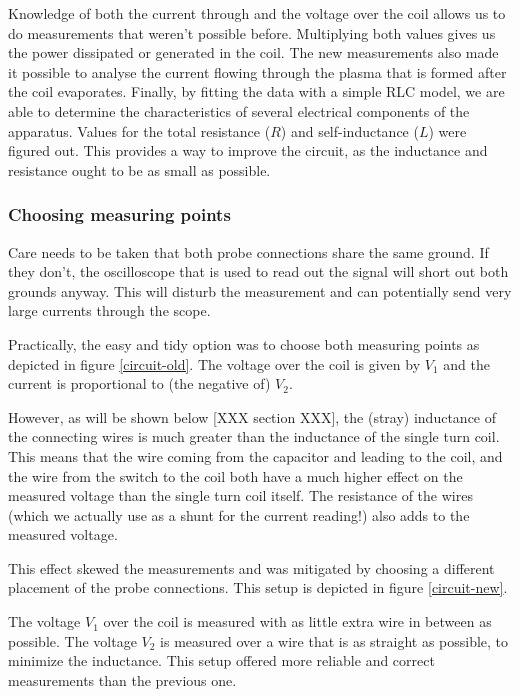 Knowledge of both the current through and the voltage over the coil allows us 
to do measurements that weren't possible before. Multiplying both values gives 
us the power dissipated or generated in the coil. The new measurements also 
made it possible to analyse the current flowing through the plasma that is 
formed after the coil evaporates. Finally, by fitting the data with a simple 
RLC model, we are able to determine the characteristics of several electrical 
components of the apparatus. Values for the total resistance ($R$) and 
self-inductance ($L$) were figured out. This provides a way to improve the 
circuit, as the inductance and resistance ought to be as small as possible.

\subsubsection{Choosing measuring points}
Care needs to be taken that both probe connections share the same ground.  
If they don't, the oscilloscope that is used to read out the signal will 
short out both grounds anyway. This will disturb the measurement and can 
potentially send very large currents through the scope.

Practically, the easy and tidy option was to choose both measuring points as 
depicted in figure \ref{circuit-old}. The voltage over the coil is given by 
$V_1$ and the current is proportional to (the negative of) $V_2$.


However, as will be shown below [XXX section XXX], the (stray) inductance 
of the connecting wires is much greater than the inductance of the single 
turn coil. This means that the wire coming from the capacitor and leading 
to the coil, and the wire from the switch to the coil both have a much 
higher effect on the measured voltage than the single turn coil itself.  
The resistance of the wires (which we actually use as a shunt for the 
current reading!) also adds to the measured voltage.

This effect skewed the measurements and was mitigated by choosing a 
different placement of the probe connections. This setup is depicted in 
figure \ref{circuit-new}.


The voltage $V_1$ over the coil is measured with as little extra wire in 
between as possible. The voltage $V_2$ is measured over a wire that is as 
straight as possible, to minimize the inductance. This setup offered more 
reliable and correct measurements than the previous one.


